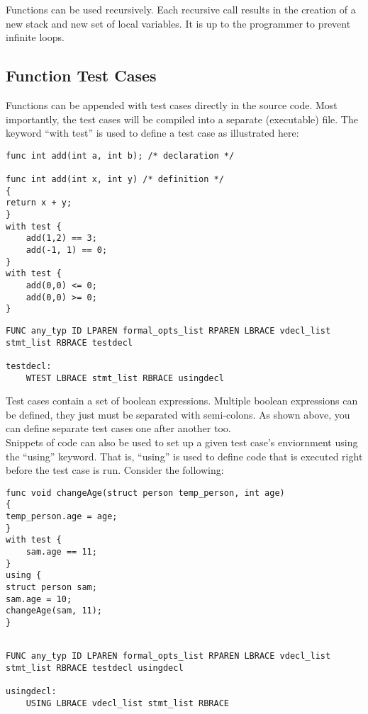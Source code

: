 \documentclass{article}
\begin{document}
Functions can be used recursively. Each recursive call results in the creation of a new stack and new set of local variables. It is up to the programmer to prevent infinite loops. 

\subsection{Function Test Cases}
Functions can be appended with test cases directly in the source code. Most importantly, the test cases will be compiled into a separate (executable) file. The keyword ``with test'' is used to define a test case as illustrated here:

\begin{lstlisting}
func int add(int a, int b); /* declaration */

func int add(int x, int y) /* definition */
{
return x + y;
}
with test {
	add(1,2) == 3;
	add(-1, 1) == 0;
}
with test {
	add(0,0) <= 0;
	add(0,0) >= 0; 
}

\end{lstlisting}

\begin{Verbatim}[frame=single]
FUNC any_typ ID LPAREN formal_opts_list RPAREN LBRACE vdecl_list stmt_list RBRACE testdecl 

testdecl:
	WTEST LBRACE stmt_list RBRACE usingdecl
\end{Verbatim}

Test cases contain a set of boolean expressions. Multiple boolean expressions can be defined, they just must be separated with semi-colons. As shown above, you can define separate test cases one after another too. \\ 
Snippets of code can also be used to set up a given test case's enviornment using the ``using'' keyword. That is, ``using'' is used to define code that is executed right before the test case is run. Consider the following:

\begin{lstlisting}
func void changeAge(struct person temp_person, int age)
{
temp_person.age = age;
}
with test {
	sam.age == 11;
}
using {
struct person sam;
sam.age = 10;
changeAge(sam, 11);
}


\end{lstlisting}


\begin{Verbatim}[frame=single]
FUNC any_typ ID LPAREN formal_opts_list RPAREN LBRACE vdecl_list stmt_list RBRACE testdecl usingdecl 

usingdecl:
	USING LBRACE vdecl_list stmt_list RBRACE 
\end{Verbatim}
\end{document}
